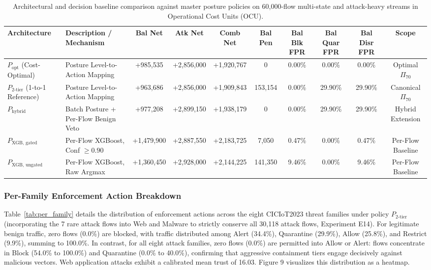 \documentclass[journal,10pt,onecolumn]{IEEEtran}
\begin{document}
\begin{table}[t]
\caption{Architectural and decision baseline comparison against master posture policies on 60,000-flow multi-state and attack-heavy streams in Operational Cost Units (OCU).}
\label{tab:architectural_baselines}
\centering
\footnotesize
\begin{tabular}{llcccccccc}
\toprule
\textbf{Architecture} & \textbf{Description / Mechanism} & \textbf{Bal Net} & \textbf{Atk Net} & \textbf{Comb Net} & \textbf{Bal Pen} & \textbf{Bal Blk FPR} & \textbf{Bal Quar FPR} & \textbf{Bal Disr FPR} & \textbf{Scope} \\
\midrule
$P_{\text{opt}}$ (Cost-Optimal) & Posture Level-to-Action Mapping & +985,535 & +2,856,000 & +1,920,767 & 0 & 0.00\% & 0.00\% & 0.00\% & Optimal $\Pi_{70}$ \\
$P_{2\text{-tier}}$ (1-to-1 Reference) & Posture Level-to-Action Mapping & +963,686 & +2,856,000 & +1,909,843 & 153,154 & 0.00\% & 29.90\% & 29.90\% & Canonical $\Pi_{70}$ \\
$P_{\text{hybrid}}$ & Batch Posture + Per-Flow Benign Veto & +977,208 & +2,899,150 & +1,938,179 & 0 & 0.00\% & 29.90\% & 29.90\% & Hybrid Extension \\
$P_{\text{XGB, gated}}$ & Per-Flow XGBoost, Conf $\ge 0.90$ & +1,479,900 & +2,887,550 & +2,183,725 & 7,050 & 0.47\% & 0.00\% & 0.47\% & Per-Flow Baseline \\
$P_{\text{XGB, ungated}}$ & Per-Flow XGBoost, Raw Argmax & +1,360,450 & +2,928,000 & +2,144,225 & 141,350 & 9.46\% & 0.00\% & 9.46\% & Per-Flow Baseline \\
\bottomrule
\end{tabular}
\end{table}

\subsubsection{Per-Family Enforcement Action Breakdown}
Table~\ref{tab:per_family} details the distribution of enforcement actions across the eight CICIoT2023 threat families under policy $P_{2\text{-tier}}$ (incorporating the 7 rare attack flows into Web and Malware to strictly conserve all 30,118 attack flows, Experiment E14). For legitimate benign traffic, zero flows (0.0\%) are blocked, with traffic distributed among Alert (34.4\%), Quarantine (29.9\%), Allow (25.8\%), and Restrict (9.9\%), summing to 100.0\%. In contrast, for all eight attack families, zero flows (0.0\%) are permitted into Allow or Alert: flows concentrate in Block (54.0\% to 100.0\%) and Quarantine (0.0\% to 40.0\%), confirming that aggressive containment tiers engage decisively against malicious vectors. Web application attacks exhibit a calibrated mean trust of 16.03. Figure 9 visualizes this distribution as a heatmap.
\end{document}
